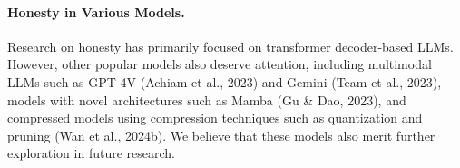 \paragraph{Honesty in Various Models.} Research on honesty has primarily focused on transformer decoder-based LLMs. However, other popular models also deserve attention, including multimodal LLMs such as GPT-4V (Achiam et al., 2023) and Gemini (Team et al., 2023), models with novel architectures such as Mamba (Gu \& Dao, 2023), and compressed models using compression techniques such as quantization and pruning (Wan et al., 2024b). We believe that these models also merit further exploration in future research.
